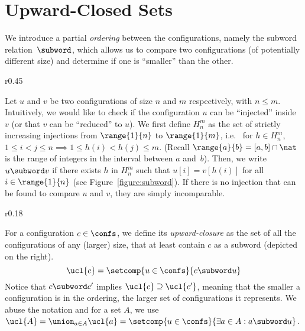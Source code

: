 \section{Upward-Closed Sets}
\label{section:upward:closed}
\label{section:bad:states}
%
%
%
We introduce a partial \emph{ordering} between the configurations, namely the
subword relation~$\subword$, which allows us to compare two
configurations (of potentially different size) and determine if one is
``smaller'' than the other.
%

%
\begin{wrapfigure}{r}{0.45\linewidth}
  \centering
  \caption{The subword relation}
  \label{figure:subword}
\end{wrapfigure}
%
Let $u$ and $v$ be two configurations of size $n$ and $m$
respectively, with $n\leq m$.
%
Intuitively, we would like to check if the configuration $u$ can be
``injected'' inside $v$ (or that $v$ can be ``reduced'' to $u$).
%
We first define $H_n^m$ as the set of strictly increasing injections
from $\range{1}{n}$ to $\range{1}{m}$, %
i.e.\ %
for $h\in H_n^m$, $1 \leq i < j \leq n \implies 1 \leq h(i) < h(j)
\leq m$. %
(Recall $\range{a}{b} = [a,b]\cap\nat$ is the range of integers in the
interval between $a$ and~$b$).
%
Then, we write $u \subword v$ if there exists $h$ in $H_n^m$ such that
$u[i]=v[h(i)]$ for all $i\in\range{1}{n}$ (see
Figure~\ref{figure:subword}).
%
If there is no injection that can be found to compare $u$ and $v$,
they are simply incomparable.

%
%
\begin{wrapfigure}{r}{0.18\linewidth}
  \hfill%
\end{wrapfigure}
%
For a configuration $c\in\confs$, we define its \emph{upward-closure}
as the set of all the configurations of any (larger) size, that at
least contain $c$ as a subword (depicted on the right).
%
$$\ucl{c}=\setcomp{u\in\confs}{c\subword u}$$
%
Notice that $c\subword c'$ implies $\ucl{c}\supseteq\ucl{c'}$, meaning
that the smaller a configuration is in the ordering, the larger set of
configurations it represents. %
We abuse the notation and for a set %
$A$, we use %
$\ucl{A} = %
\union_{a{\in}A}\ucl{a} = %
\setcomp{u\in\confs}{\exists a\in A : a\subword u}$.

